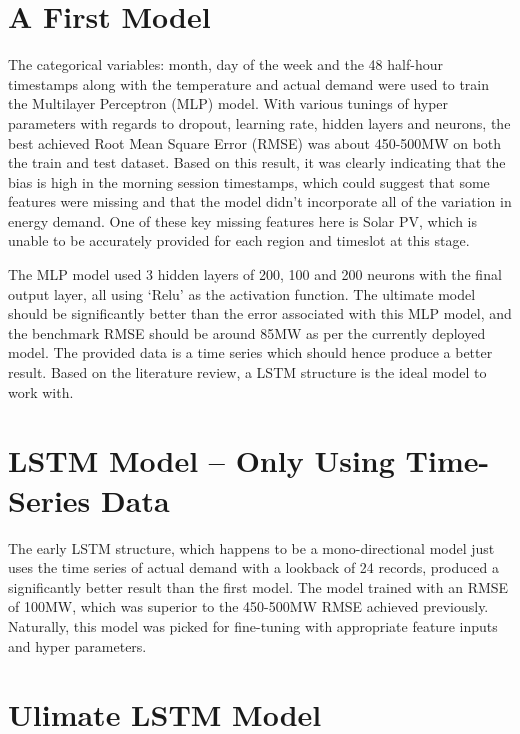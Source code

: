 \documentclass[mstat,12pt]{unswthesis}
\begin{document}
\hypertarget{a-first-model}{%
\section{A First Model}\label{a-first-model}}

The categorical variables: month, day of the week and the 48 half-hour
timestamps along with the temperature and actual demand were used to
train the Multilayer Perceptron (MLP) model. With various tunings of
hyper parameters with regards to dropout, learning rate, hidden layers
and neurons, the best achieved Root Mean Square Error (RMSE) was about
450-500MW on both the train and test dataset. Based on this result, it
was clearly indicating that the bias is high in the morning session
timestamps, which could suggest that some features were missing and that
the model didn't incorporate all of the variation in energy demand. One
of these key missing features here is Solar PV, which is unable to be
accurately provided for each region and timeslot at this stage.

\bigskip

The MLP model used 3 hidden layers of 200, 100 and 200 neurons with the
final output layer, all using `Relu' as the activation function. The
ultimate model should be significantly better than the error associated
with this MLP model, and the benchmark RMSE should be around 85MW as per
the currently deployed model. The provided data is a time series which
should hence produce a better result. Based on the literature review, a
LSTM structure is the ideal model to work with.

\bigskip

\hypertarget{lstm-model-only-using-time-series-data}{%
\section{LSTM Model -- Only Using Time-Series
Data}\label{lstm-model-only-using-time-series-data}}

The early LSTM structure, which happens to be a mono-directional model
just uses the time series of actual demand with a lookback of 24
records, produced a significantly better result than the first model.
The model trained with an RMSE of 100MW, which was superior to the
450-500MW RMSE achieved previously. Naturally, this model was picked for
fine-tuning with appropriate feature inputs and hyper parameters.

\bigskip

\hypertarget{ulimate-lstm-model}{%
\section{Ulimate LSTM Model}\label{ulimate-lstm-model}}
\end{document}
